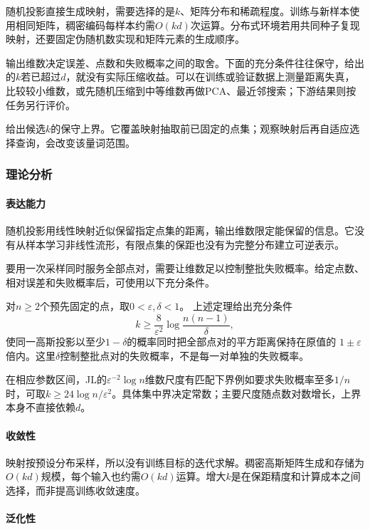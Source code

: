 随机投影直接生成映射，需要选择的是$k$、矩阵分布和稀疏程度。训练与新样本使用相同矩阵，稠密编码每样本约需$O(kd)$次运算。分布式环境若用共同种子复现映射，还要固定伪随机数实现和矩阵元素的生成顺序。

输出维数决定误差、点数和失败概率之间的取舍。下面的充分条件往往保守，给出的$k$若已超过$d$，就没有实际压缩收益。可以在训练或验证数据上测量距离失真，比较较小维数，或先随机压缩到中等维数再做PCA、最近邻搜索；下游结果则按任务另行评价。

给出候选$k$的保守上界。它覆盖映射抽取前已固定的点集；观察映射后再自适应选择查询，会改变该量词范围。

\subsubsection{理论分析}
\label{sec:dim-rp-theory}

\paragraph{表达能力}
随机投影用线性映射近似保留指定点集的距离，输出维数限定能保留的信息。它没有从样本学习非线性流形，有限点集的保距也没有为完整分布建立可逆表示。

要用一次采样同时服务全部点对，需要让维数足以控制整批失败概率。给定点数、相对误差和失败概率后，可使用以下充分条件。

对$n\geq2$个预先固定的点，取$0<\varepsilon,\delta<1$。
上述定理给出充分条件
\[
  k\geq\frac{8}{\varepsilon^2}\log\frac{n(n-1)}{\delta},
\]
使同一高斯投影以至少$1-\delta$的概率同时把全部点对的平方距离保持在原值的
$1\pm\varepsilon$倍内。这里$\delta$控制整批点对的失败概率，不是每一对单独的失败概率。

在相应参数区间，JL的$\varepsilon^{-2}\log n$维数尺度有匹配下界例如要求失败概率至多$1/n$时，可取$k\geq24\log n/\varepsilon^2$。具体集中界决定常数；主要尺度随点数对数增长，上界本身不直接依赖$d$。

\paragraph{收敛性}
映射按预设分布采样，所以没有训练目标的迭代求解。稠密高斯矩阵生成和存储为$O(kd)$规模，每个输入也约需$O(kd)$运算。增大$k$是在保距精度和计算成本之间选择，而非提高训练收敛速度。

\paragraph{泛化性}

